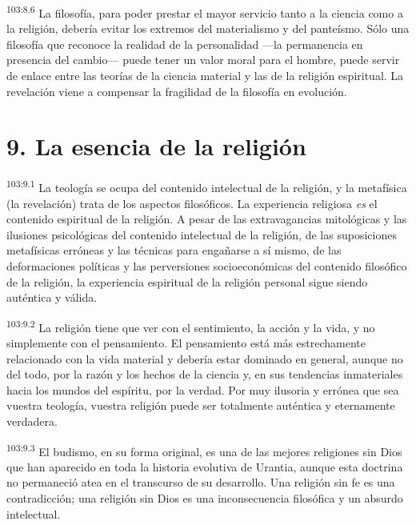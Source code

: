 \par
\textsuperscript{103:8.6} La filosofía, para poder prestar el mayor servicio tanto a la ciencia como a la religión, debería evitar los extremos del materialismo y del panteísmo. Sólo una filosofía que reconoce la realidad de la personalidad ---la permanencia en presencia del cambio--- puede tener un valor moral para el hombre, puede servir de enlace entre las teorías de la ciencia material y las de la religión espiritual. La revelación viene a compensar la fragilidad de la filosofía en evolución.

\section*{9. La esencia de la religión}
\par
\textsuperscript{103:9.1} La teología se ocupa del contenido intelectual de la religión, y la metafísica (la revelación) trata de los aspectos filosóficos. La experiencia religiosa \textit{es} el contenido espiritual de la religión. A pesar de las extravagancias mitológicas y las ilusiones psicológicas del contenido intelectual de la religión, de las suposiciones metafísicas erróneas y las técnicas para engañarse a sí mismo, de las deformaciones políticas y las perversiones socioeconómicas del contenido filosófico de la religión, la experiencia espiritual de la religión personal sigue siendo auténtica y válida.

\par
\textsuperscript{103:9.2} La religión tiene que ver con el sentimiento, la acción y la vida, y no simplemente con el pensamiento. El pensamiento está más estrechamente relacionado con la vida material y debería estar dominado en general, aunque no del todo, por la razón y los hechos de la ciencia y, en sus tendencias inmateriales hacia los mundos del espíritu, por la verdad. Por muy ilusoria y errónea que sea vuestra teología, vuestra religión puede ser totalmente auténtica y eternamente verdadera.

\par
\textsuperscript{103:9.3} El budismo, en su forma original, es una de las mejores religiones sin Dios que han aparecido en toda la historia evolutiva de Urantia, aunque esta doctrina no permaneció atea en el transcurso de su desarrollo. Una religión sin fe es una contradicción; una religión sin Dios es una inconsecuencia filosófica y un absurdo intelectual.

